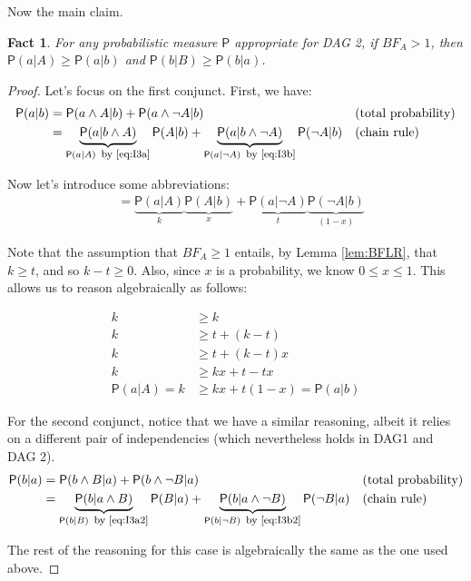 \documentclass[
  10pt,
  dvipsnames,enabledeprecatedfontcommands]{scrartcl}
\newtheorem{fact}{Fact}
\newcommand{\n}{\neg}
\newcommand{\et}{\wedge}
\newcommand{\pr}[1]{\ensuremath{\mathsf{P}(#1)}}
\begin{document}
Now the main claim.

\begin{fact}
For any probabilistic measure $\mathsf{P}$ appropriate for \textsf{DAG 2}, if $BF_A >1$, then $\pr{a \vert A} \geq \pr{a \vert b}$ and 
$\pr{b \vert B} \geq \pr{b \vert a}$.
\label{fact:BFweaker3}
\end{fact}

\begin{proof}

Let's focus on the first conjunct. First, we have:
\begin{align*}
\pr{a \vert b} & = \pr{a \et A \vert b} + \pr{a \et \n A \vert b} & &   (\mbox{total probability}) \\
& = \underbrace{\pr{a \vert b \et A}}_{\pr{a \vert A}  \mbox{\footnotesize \, by \eqref{eq:I3a}}} \pr{A \vert b} +
\underbrace{\pr{a \vert b \et \n A}}_{\pr{a \vert \n A} \mbox{\footnotesize \, by \eqref{eq:I3b}}}\pr{\n A \vert b}  & &   (\mbox{chain rule}) \\
\end{align*}

Now let's introduce some abbreviations:
\begin{align*}
& = \underbrace{\pr{a\vert A}}_k \underbrace{\pr{A \vert b}}_x + \underbrace{\pr{a \vert \n A}}_t \underbrace{\pr{\n A \vert b}}_{(1- x)}
\end{align*}

\noindent Note that the assumption that $BF_A\geq 1$ entails, by Lemma \ref{lem:BFLR}, that $k \geq t$, and so $k-t \geq 0$. Also, since $x$ is a probability, we know $0 \leq x \leq 1$. This allows us to reason algebraically as follows:

\begin{align*}
k & \geq k  \\
k & \geq t + (k - t) \\
k & \geq t + (k -t)x \\
k & \geq kx + t  - tx \\
\pr{a \vert A} = k & \geq kx + t(1-x) = \pr{a \vert b}
\end{align*}

For the second conjunct, notice that we have a similar reasoning, albeit it relies on a different pair of independencies (which nevertheless holds in \textsf{DAG1} and \textsf{DAG 2}).
\begin{align*}
\pr{b \vert a} & = \pr{b \et B \vert a} + \pr{b \et \n B \vert a} & &   (\mbox{total probability}) \\
& = \underbrace{\pr{b \vert a \et B}}_{\pr{b \vert B}  \mbox{\footnotesize \, by \eqref{eq:I3a2}}} \pr{B \vert a} +
\underbrace{\pr{b \vert a \et \n B}}_{\pr{b \vert \n B} \mbox{\footnotesize \, by \eqref{eq:I3b2}}}\pr{\n B \vert a}  & &   (\mbox{chain rule}) \\
\end{align*}

\noindent The rest of the reasoning for this case is algebraically the same as the one used above.
\end{proof}
\end{document}
